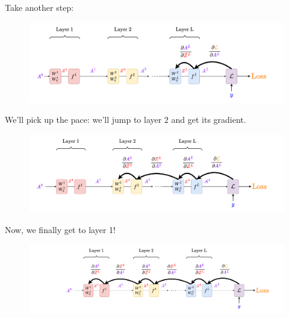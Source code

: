         Take another step:
        
        \begin{figure}[H]
            \centering
            \includegraphics[width=180mm,scale=0.4]{images/nn_2_images/network_bp_full2.png}
        \end{figure}
        
        We'll pick up the pace: we'll jump to layer 2 and get its gradient.
        
        \begin{figure}[H]
            \centering
            \includegraphics[width=180mm,scale=0.4]{images/nn_2_images/network_bp_full3.png}
        \end{figure}
        
        Now, we finally get to layer 1!
        
        \begin{figure}[H]
            \centering
            \includegraphics[width=180mm,scale=0.4]{images/nn_2_images/network_bp_full4.png}
        \end{figure}
        
